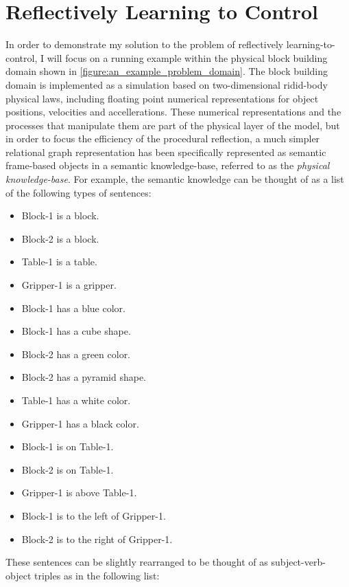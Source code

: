 \chapter{Reflectively Learning to Control}
\label{chapter:reflectively_learning_to_control}

In order to demonstrate my solution to the problem of reflectively
learning-to-control, I will focus on a running example within the
physical block building domain shown in
\autoref{figure:an_example_problem_domain}.  The block building domain
is implemented as a simulation based on two-dimensional ridid-body
physical laws, including floating point numerical representations for
object positions, velocities and accellerations.  These numerical
representations and the processes that manipulate them are part of the
physical layer of the model, but in order to focus the efficiency of
the procedural reflection, a much simpler relational graph
representation has been specifically represented as semantic
frame-based objects in a semantic knowledge-base, referred to as the
\emph{physical knowledge-base}.  For example, the semantic knowledge
can be thought of as a list of the following types of sentences:
\begin{itemize}
\item Block-1 is a block.
\item Block-2 is a block.
\item Table-1 is a table.
\item Gripper-1 is a gripper.
\item Block-1 has a blue color.
\item Block-1 has a cube shape.
\item Block-2 has a green color.
\item Block-2 has a pyramid shape.
\item Table-1 has a white color.
\item Gripper-1 has a black color.
\item Block-1 is on Table-1.
\item Block-2 is on Table-1.
\item Gripper-1 is above Table-1.
\item Block-1 is to the left of Gripper-1.
\item Block-2 is to the right of Gripper-1.
\end{itemize}
These sentences can be slightly rearranged to be thought of as
subject-verb-object triples as in the following list:
